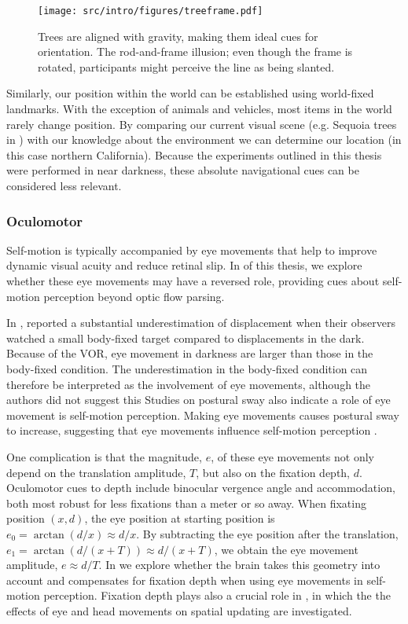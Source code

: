 \begin{figure}
	\texttt{[image: src/intro/figures/treeframe.pdf]}
	\caption{ Trees are aligned with gravity, making them ideal cues for orientation.  The rod-and-frame illusion; even though the frame is rotated, participants might perceive the line as being slanted.}
	\label{intro:fig:treeframe}
\end{figure}

Similarly, our position within the world can be established using world-fixed landmarks. With the exception of animals and vehicles, most items in the world rarely change position. By comparing our current visual scene (e.g. Sequoia trees in ) with our knowledge about the environment we can determine our location (in this case northern California). Because the experiments outlined in this thesis were performed in near darkness, these absolute navigational cues can be considered less relevant. 


\subsubsection{Oculomotor}
Self-motion is typically accompanied by eye movements that help to improve dynamic visual acuity and reduce retinal slip. In  of this thesis, we explore whether these eye movements may have a reversed role, providing cues about self-motion perception beyond optic flow parsing. 

In , \citeauthor{guedry1963} reported a substantial underestimation of displacement when their observers watched a small body-fixed target compared to displacements in the dark. Because of the VOR, eye movement in darkness are larger than those in the body-fixed condition. The underestimation in the body-fixed condition can therefore be interpreted as the involvement of eye movements, although the authors did not suggest this 
Studies on postural sway also indicate a role of eye movement is self-motion perception. Making eye movements causes postural sway to increase, suggesting that eye movements influence self-motion perception \cite{glasauer2005,rodrigues2015}.

One complication is that the magnitude, $e$, of these eye movements not only depend on the translation amplitude, $T$, but also on the fixation depth, $d$. Oculomotor cues to depth include binocular vergence angle and accommodation, both most robust for less fixations than a meter or so away. When fixating position $(x, d)$, the eye position at starting position is $e_0 = \arctan(d/x) \approx d/x$. By subtracting the eye position after the translation, $e_1 = \arctan(d/(x+T)) \approx d/(x+T)$, we obtain the eye movement amplitude, $e \approx d/T$. In  we explore whether the brain takes this geometry into account and compensates for fixation depth when using eye movements in self-motion perception. Fixation depth plays also a crucial role in , in which the the effects of eye and head movements on spatial updating are investigated.


